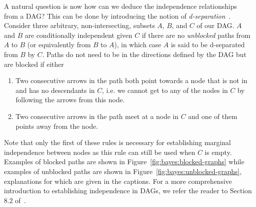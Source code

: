 A natural question is now how can we deduce the independence relationships from a DAG?
This can be done by introducing the notion of \emph{d-separation}~\citep{pearl2014probabilistic}.
Consider three arbitrary, non-intersecting, subsets $A$, $B$, and $C$ of our DAG.  $A$ and $B$
are conditionally independent given $C$ if there are no \emph{unblocked} paths from $A$ to $B$
(or equivalently from $B$ to $A$), in which case $A$ is said to be d-separated from $B$ by $C$.  
Paths do not need to be in the directions defined by the DAG but are blocked if either
\begin{enumerate}
	\item Two consecutive arrows in the path both point towards a node that is not in and
	has no descendants in $C$, i.e. we cannot get to any of the nodes in $C$ by following the arrows
	from this node.
	\item Two consecutive arrows in the path meet at a node in $C$ and one of them
	points away from the node.
\end{enumerate}
Note that only the first of these rules is necessary for establishing marginal independence
between nodes as this rule can still be used when $C$ is empty.
Examples of blocked paths are shown in Figure~\ref{fig:bayes:blocked-graphs} while examples of unblocked paths
are shown in Figure~\ref{fig:bayes:unblocked-graphs}, explanations for which are given in the captions.
For a more comprehensive introduction to establishing independence in DAGs, we
refer the reader to Section 8.2 of~\cite{bishop2006pattern}.

